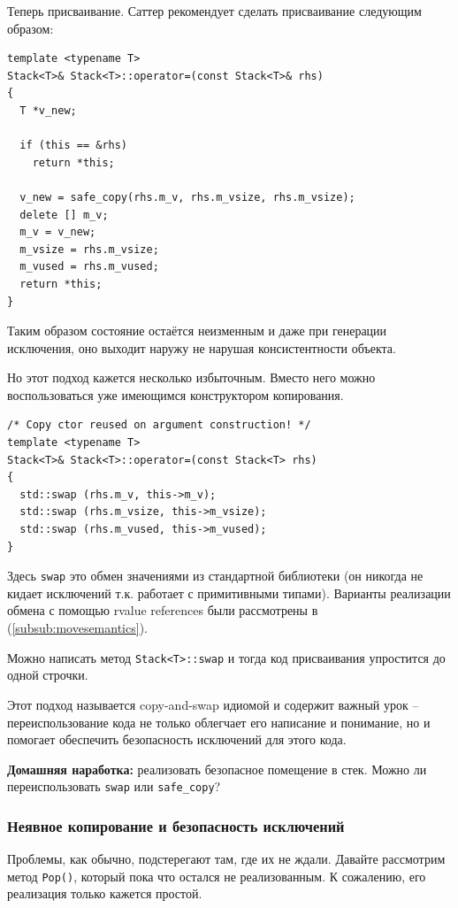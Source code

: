 \documentclass[a4paper,12pt,oneside]{article}
\begin{document}
Теперь присваивание. Саттер рекомендует сделать присваивание следующим образом:

\begin{lstlisting}
template <typename T>
Stack<T>& Stack<T>::operator=(const Stack<T>& rhs)
{
  T *v_new;

  if (this == &rhs)
    return *this;

  v_new = safe_copy(rhs.m_v, rhs.m_vsize, rhs.m_vsize);
  delete [] m_v;
  m_v = v_new;
  m_vsize = rhs.m_vsize; 
  m_vused = rhs.m_vused;
  return *this;
}
\end{lstlisting}

Таким образом состояние остаётся неизменным и даже при генерации исключения, оно выходит наружу не нарушая консистентности объекта.

Но этот подход кажется несколько избыточным. Вместо него можно воспользоваться уже имеющимся конструктором копирования.

\begin{lstlisting}
/* Copy ctor reused on argument construction! */
template <typename T>
Stack<T>& Stack<T>::operator=(const Stack<T> rhs)
{
  std::swap (rhs.m_v, this->m_v);
  std::swap (rhs.m_vsize, this->m_vsize);
  std::swap (rhs.m_vused, this->m_vused);
}
\end{lstlisting}

Здесь \lstinline!swap! это обмен значениями из стандартной библиотеки (он никогда не кидает исключений т.к. работает с примитивными типами). Варианты реализации обмена с помощью rvalue references были рассмотрены в (\ref{subsub:movesemantics}).

Можно написать метод \lstinline!Stack<T>::swap! и тогда код присваивания упростится до одной строчки.

Этот подход называется copy-and-swap идиомой и содержит важный урок -- переиспользование кода не только облегчает его написание и понимание, но и помогает обеспечить безопасность исключений для этого кода.

\textbf{Домашняя наработка:} реализовать безопасное помещение в стек. Можно ли переиспользовать \lstinline!swap! или \lstinline!safe_copy!?

\subsubsection{Неявное копирование и безопасность исключений}\label{ImplicitCopy}

Проблемы, как обычно, подстерегают там, где их не ждали. Давайте рассмотрим метод \lstinline!Pop()!, который пока что остался не реализованным. К сожалению, его реализация только кажется простой.
\end{document}
